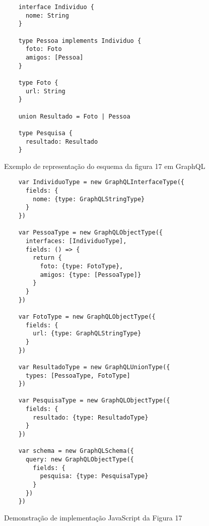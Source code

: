 \begin{figure}[H]
  \centering
  \begin{verbatim}
    interface Individuo {
      nome: String
    }

    type Pessoa implements Individuo {
      foto: Foto
      amigos: [Pessoa]
    }

    type Foto {
      url: String
    }

    union Resultado = Foto | Pessoa

    type Pesquisa {
      resultado: Resultado
    }
  \end{verbatim}
  \caption{Exemplo de representação do esquema da figura 17 em GraphQL}
\end{figure}

\begin{figure}[H]
  \centering
  \begin{verbatim}    
    var IndividuoType = new GraphQLInterfaceType({
      fields: {
        nome: {type: GraphQLStringType}
      }
    })
    
    var PessoaType = new GraphQLObjectType({
      interfaces: [IndividuoType],
      fields: () => {
        return {
          foto: {type: FotoType}, 
          amigos: {type: [PessoaType]}
        }
      }
    })
    
    var FotoType = new GraphQLObjectType({
      fields: {
        url: {type: GraphQLStringType}
      }
    })
    
    var ResultadoType = new GraphQLUnionType({
      types: [PessoaType, FotoType]
    })
    
    var PesquisaType = new GraphQLObjectType({
      fields: {
        resultado: {type: ResultadoType}
      }
    })

    var schema = new GraphQLSchema({
      query: new GraphQLObjectType({
        fields: {
          pesquisa: {type: PesquisaType}
        }
      })
    })
  \end{verbatim}
  \caption{Demonstração de implementação JavaScript da Figura 17}
\end{figure}
